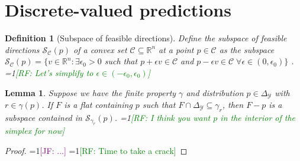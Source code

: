 \documentclass{article}
\newcommand{\Comments}{1}
\newcommand{\mynote}[2]{\ifnum\Comments=1\textcolor{#1}{#2}\fi}
\newcommand{\raf}[1]{\mynote{green}{[RF: #1]}}
\newcommand{\jessie}[1]{\mynote{purple}{[JF: #1]}}
\newcommand{\reals}{\mathbb{R}}
\newcommand{\simplex}{\Delta_\Y}
\newcommand{\C}{\mathcal{C}}
\newcommand{\R}{\mathcal{R}}
\renewcommand{\S}{\mathcal{S}}
\newcommand{\Y}{\mathcal{Y}}
\newtheorem{lemma}{Lemma}
\newtheorem{definition}{Definition}
\begin{document}
\section{Discrete-valued predictions}\label{sec:finite-calib}


\begin{definition}[Subspace of feasible directions]
	Define the \emph{subspace of feasible directions} $\S_\C(p)$ of a convex set $\C \subseteq \reals^n$ at a point $p \in \C$ as the subspace $\S_\C(p) = \{ v \in \reals^n : \exists \epsilon_0 > 0 $ such that $p + \epsilon v \in \C$ and $p - \epsilon v \in \C \; \forall \epsilon \in (0,\epsilon_0) \}$ .
  \raf{Let's simplify to $\epsilon \in (-\epsilon_0,\epsilon_0)$}
\end{definition}

\begin{lemma}\label{lem:feas-sub-is-a-flat}
	Suppose we have the finite property $\gamma$ and distribution $p \in \simplex$ with $r \in \gamma(p)$.
	If $F$ is a flat containing $p$ such that $F \cap \simplex \subseteq \gamma_r$, then $F - p$ is a subspace contained in $\S_{\gamma_r}(p)$.
  \raf{I think you want $p$ in the interior of the simplex for now}
\end{lemma}
\begin{proof}
  \jessie{...}
  \raf{Time to take a crack}
\end{proof}
\end{document}
